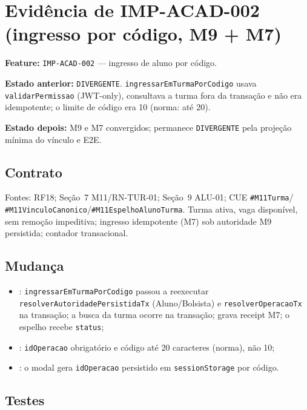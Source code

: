 \section{Evidência de IMP-ACAD-002 (ingresso por código, M9 + M7)}

\textbf{Feature:} \texttt{IMP-ACAD-002} --- ingresso de aluno por código.

\textbf{Estado anterior:} \texttt{DIVERGENTE}. \texttt{ingressarEmTurmaPorCodigo}
usava \texttt{validarPermissao} (JWT-only), consultava a turma fora da transação
e não era idempotente; o limite de código era 10 (norma: até 20).

\textbf{Estado depois:} M9 e M7 convergidos; permanece \texttt{DIVERGENTE} pela
projeção mínima do vínculo e E2E.

\subsection{Contrato}

Fontes: RF18; Seção~7 M11/RN-TUR-01; Seção~9 ALU-01; CUE \texttt{\#M11Turma}/
\texttt{\#M11VinculoCanonico}/\texttt{\#M11EspelhoAlunoTurma}. Turma ativa, vaga
disponível, sem remoção impeditiva; ingresso idempotente (M7) sob autoridade M9
persistida; contador transacional.

\subsection{Mudança}

\begin{itemize}
  \item {}: \texttt{ingressarEmTurmaPorCodigo}
  passou a reexecutar \texttt{resolverAutoridadePersistidaTx} (Aluno/Bolsista) e
  \texttt{resolverOperacaoTx} na transação; a busca da turma ocorre na
  transação; grava receipt M7; o espelho recebe \texttt{status};
  \item {}: \texttt{idOperacao}
  obrigatório e código até 20 caracteres (norma), não 10;
  \item {}: o modal gera
  \texttt{idOperacao} persistido em \texttt{sessionStorage} por código.
\end{itemize}

\subsection{Testes}

